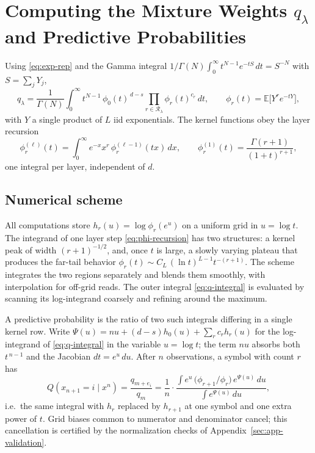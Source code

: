\documentclass[11pt]{article}
\newcommand{\E}{\mathbb{E}}
\newcommand{\Nseq}{N}
\begin{document}
\section{Computing the Mixture Weights \texorpdfstring{\(q_\lambda\)}{q-lambda} and Predictive Probabilities}
\label{sec:app-mixture-terms}
Using \eqref{eq:exp-rep} and the Gamma integral
\(1/\Gamma(\Nseq)\int_0^\infty t^{\Nseq-1}e^{-tS}\,dt=S^{-\Nseq}\) with
\(S=\sum_j Y_j\),
\begin{equation}
\label{eq:q-integral}
  q_\lambda
  =
  \frac{1}{\Gamma(\Nseq)}
  \int_0^\infty t^{\Nseq-1}
  \,\phi_0(t)^{\,d-s}
  \prod_{r\in\mathcal R_\lambda}\phi_r(t)^{c_r}
  \,dt,
  \qquad
  \phi_r(t)=\E\bigl[Y^r e^{-tY}\bigr],
\end{equation}
with \(Y\) a single product of \(L\) iid exponentials.  The kernel functions
obey the layer recursion
\begin{equation}
\label{eq:phi-recursion}
  \phi^{(\ell)}_r(t)
  =
  \int_0^\infty e^{-x}x^r\,\phi^{(\ell-1)}_r(tx)\,dx,
  \qquad
  \phi^{(1)}_r(t)=\frac{\Gamma(r+1)}{(1+t)^{r+1}},
\end{equation}
one integral per layer, independent of \(d\).
\subsection{Numerical scheme}
\label{sec:app-numerics}
All computations store \(h_r(u)=\log\phi_r(e^u)\) on a uniform grid in
\(u=\log t\).  The integrand of one layer step \eqref{eq:phi-recursion}
has two structures: a kernel peak of width \((r+1)^{-1/2}\), and, once
\(t\) is large, a slowly varying plateau that produces the far-tail
behavior \(\phi_r(t)\sim C_L\,(\ln t)^{L-1}t^{-(r+1)}\).  The scheme
integrates the two regions separately and blends them smoothly, with
interpolation for off-grid reads.  The outer integral
\eqref{eq:q-integral} is evaluated by scanning its log-integrand coarsely
and refining around the maximum.  

A predictive probability is the ratio of two such integrals differing in a
single kernel row. Write
\(\Psi(u)=n u+(d-s)h_0(u)+\sum_r c_r h_r(u)\) for the log-integrand of
\eqref{eq:q-integral} in the variable \(u=\log t\); the term \(nu\)
absorbs both \(t^{\,n-1}\) and the Jacobian \(dt=e^{u}\,du\). After
\(n\) observations, a symbol with count \(r\) has
\[
Q(x_{n+1}=i\mid x^n)
=
\frac{q_{m+e_i}}{q_m}
=
\frac{1}{n}
\cdot
\frac{\int e^{u}\,\bigl(\phi_{r+1}/\phi_r\bigr)\,
e^{\Psi(u)}\,du}{\int e^{\Psi(u)}\,du},
\]
i.e.\ the same integral with \(h_r\) replaced by \(h_{r+1}\) at one symbol
and one extra power of \(t\).
Grid biases common to numerator and denominator cancel; this cancellation
is certified by the normalization checks of
Appendix~\ref{sec:app-validation}.
\end{document}
